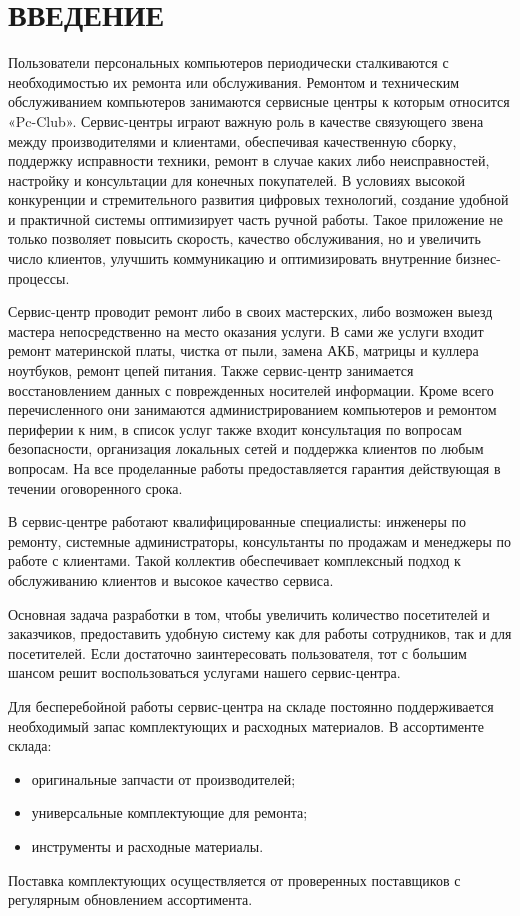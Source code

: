 \section*{ВВЕДЕНИЕ}

Пользователи персональных компьютеров периодически сталкиваются с необходимостью их ремонта или обслуживания. Ремонтом и техническим обслуживанием  компьютеров занимаются сервисные центры к которым относится «Pc-Club». Сервис-центры играют важную роль в качестве связующего звена между производителями и клиентами, обеспечивая качественную сборку, поддержку исправности техники, ремонт в случае каких либо неисправностей, настройку и консультации для конечных покупателей. В условиях высокой конкуренции и стремительного развития цифровых технологий, создание удобной и практичной системы оптимизирует часть ручной работы. Такое приложение не только позволяет повысить скорость, качество обслуживания, но и увеличить число клиентов, улучшить коммуникацию и оптимизировать внутренние бизнес-процессы.

Сервис-центр проводит ремонт либо в своих мастерских, либо возможен выезд мастера непосредственно на место оказания услуги. В сами же услуги входит ремонт материнской платы, чистка от пыли, замена АКБ, матрицы и куллера ноутбуков, ремонт цепей питания. Также сервис-центр занимается восстановлением данных с поврежденных носителей информации. Кроме всего перечисленного они занимаются администрированием компьютеров и ремонтом периферии к ним, в список услуг также входит консультация по вопросам безопасности, организация локальных сетей и поддержка клиентов по любым вопросам. На все проделанные работы предоставляется гарантия действующая в течении оговоренного срока.

В сервис-центре работают квалифицированные специалисты: инженеры по ремонту, системные администраторы, консультанты по продажам и менеджеры по работе с клиентами. Такой коллектив обеспечивает комплексный подход к обслуживанию клиентов и высокое качество сервиса.

Основная задача разработки в том, чтобы увеличить количество посетителей и заказчиков, предоставить удобную систему как для работы сотрудников, так и для посетителей. Если достаточно заинтересовать пользователя, тот с большим шансом решит воспользоваться услугами нашего сервис-центра.

Для бесперебойной работы сервис-центра на складе постоянно поддерживается необходимый запас комплектующих и расходных материалов. В ассортименте склада:
\begin{itemize}
\item оригинальные запчасти от производителей;
\item универсальные комплектующие для ремонта;
\item инструменты и расходные материалы.
\end{itemize}
Поставка комплектующих осуществляется от проверенных поставщиков с регулярным обновлением ассортимента. 

